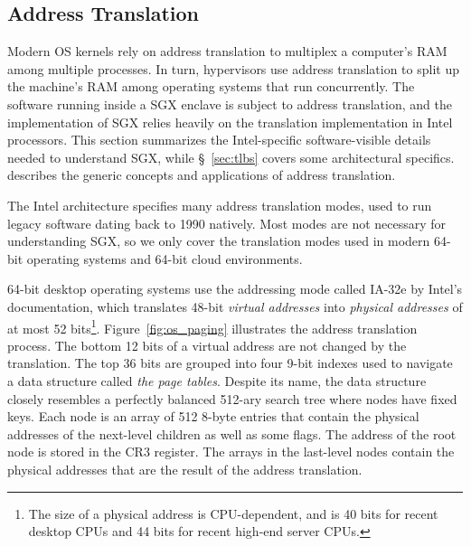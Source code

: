 \subsection{Address Translation}
\label{sec:paging}

Modern OS kernels rely on address translation to multiplex a computer's RAM
among multiple processes. In turn, hypervisors use address translation to
split up the machine's RAM among operating systems that run concurrently. The
software running inside a SGX enclave is subject to address translation, and
the implementation of SGX relies heavily on the translation implementation in
Intel processors. This section summarizes the Intel-specific software-visible
details needed to understand SGX, while \S~\ref{sec:tlbs} covers some
architectural specifics. \cite{jacob1998virtual} describes the generic concepts
and applications of address translation.

The Intel architecture specifies many address translation modes, used to run
legacy software dating back to 1990 natively. Most modes are not necessary for
understanding SGX, so we only cover the translation modes used in modern 64-bit
operating systems and 64-bit cloud environments.

64-bit desktop operating systems use the addressing mode called IA-32e by
Intel's documentation, which translates 48-bit \textit{virtual addresses} into
\textit{physical addresses} of at most 52 bits\footnote{The size of a physical
  address is CPU-dependent, and is 40 bits for recent desktop CPUs and 44 bits
for recent high-end server CPUs.}.  Figure~\ref{fig:os_paging} illustrates the
address translation process. The bottom 12 bits of a virtual address are not
changed by the translation. The top 36 bits are grouped into four 9-bit indexes
used to navigate a data structure called \textit{the page tables}. Despite its
name, the data structure closely resembles a perfectly balanced 512-ary search
tree where nodes have fixed keys.  Each node is an array of 512 8-byte entries
that contain the physical addresses of the next-level children as well as some
flags. The address of the root node is stored in the CR3 register. The arrays
in the last-level nodes contain the physical addresses that are the result of
the address translation.


